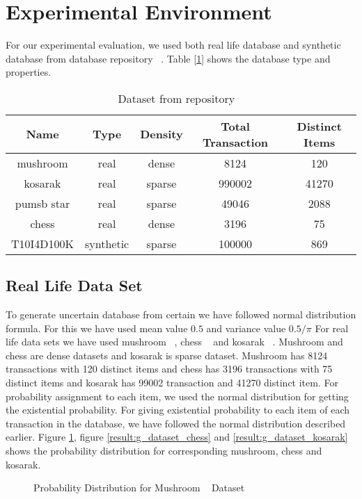 \section{Experimental Environment}
For our experimental evaluation, we used both real life database and synthetic database from database repository ~\cite{dataset}. Table [\ref{table:dataset}] shows the database type and properties.
        \begin{table}[h]
        \centering
        \begin{tabular}{|c|c|c|c|c|}
        \hline 
        Name        &    Type    &    Density    &    Total Transaction     &    Distinct Items    \\ \hline \hline
        mushroom    &    real    &    dense    &    8124    &    120                            \\ \hline
        kosarak        &    real    &    sparse    &    990002    &    41270                        \\ \hline
        pumsb star    &    real    &    sparse    &    49046    &    2088                        \\ \hline
        chess        &    real    &    dense    &    3196    &    75                            \\ \hline
        T10I4D100K    &    synthetic    &    sparse    &    100000    &    869                        \\ \hline
            \end{tabular}
        \caption{Dataset from repository ~\cite{dataset}}
        \label{table:dataset}
        \end{table}


\subsection{Real Life Data Set}
To generate uncertain database from certain we have followed normal distribution formula. For this we have used mean value $0.5$ and variance value $0.5 / \pi$
For real life data sets we have used mushroom ~\cite{dataset}, chess ~\cite{dataset} and kosarak ~\cite{dataset}. Mushroom and chess are dense datasets and kosarak is sparse dataset. Mushroom has 8124 transactions with 120 distinct items and chess has 3196 transactions with 75 distinct items and kosarak has 99002 transaction and 41270 distinct item. For probability assignment to each item, we used the normal distribution for getting the existential probability. For giving existential probability to each item of each transaction in the database, we have followed the normal distribution described earlier. Figure \ref{result:g_dataset_mushroom}, figure \ref{result:g_dataset_chess} and \ref{result:g_dataset_kosarak} shows the probability distribution for corresponding mushroom, chess and kosarak.
        \begin{figure}[h]
        \centering
            
        \caption{Probability Distribution for Mushroom ~\cite{dataset} Dataset}
        \label{result:g_dataset_mushroom}
        \end{figure}
        

